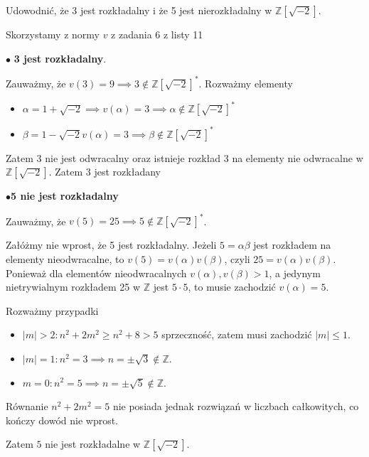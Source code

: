 \begin{problem}[5]
	Udowodnić, że 3 jest rozkładalny i że 5 jest nierozkładalny w $\mathbb{Z}\left[ \sqrt{-2}  \right]$.
\end{problem} 
\begin{solution}

Skorzystamy z normy $v$ z zadania 6 z listy 11

\noindent$\bullet$ \textbf{3 jest rozkładalny}.

Zauważmy, że $v\left( 3 \right) = 9 \implies 3 \not\in \mathbb{Z} \left[ \sqrt{-2}  \right] ^{\ast}$. Rozważmy elementy
\begin{itemize}
	\item $\alpha = 1 + \sqrt{-2} \implies v\left( \alpha  \right) = 3 \implies \alpha \not\in \mathbb{Z} \left[ \sqrt{-2}  \right] ^{\ast} $ 
	\item $\beta = 1 - \sqrt{-2} v\left( \alpha  \right) = 3 \implies \beta  \not\in \mathbb{Z} \left[ \sqrt{-2}  \right] ^{\ast}$
\end{itemize}
Zatem $3$ nie jest odwracalny oraz istnieje rozkład $3$ na elementy nie odwracalne w $\mathbb{Z} \left[ \sqrt{-2}  \right] $. Zatem $3$ jest rozkładany


\noindent$\bullet$\textbf{5 nie jest rozkładalny}

Zauważmy, że $v\left( 5 \right) = 25 \implies 5 \not\in \mathbb{Z} \left[ \sqrt{-2}  \right] ^{\ast} $.

Załóżmy nie wprost, że 5 jest rozkładalny. Jeżeli $5 = \alpha \beta $ jest rozkładem na elementy nieodwracalne, to $v\left( 5 \right) = v\left( \alpha  \right) v\left( \beta  \right)$, czyli $25 = v\left( \alpha  \right) v\left( \beta  \right) $. Ponieważ dla elementów nieodwracalnych $v\left( \alpha  \right) , v\left( \beta  \right) > 1$, a jedynym nietrywialnym rozkładem 25 w $\mathbb{Z}$ jest $5\cdot 5$, to musie zachodzić $v\left( \alpha  \right) = 5$. 

Rozważmy przypadki
\begin{itemize}
	\item $\left| m \right| > 2: n^2 + 2m^2 \ge  n^2 + 8 > 5$ sprzeczność, zatem musi zachodzić $\left| m \right| \le 1$.
	\item $\left| m \right| = 1: n^2 = 3 \implies n = \pm\sqrt{3} \not\in \mathbb{Z}$.
	\item $m=0: n^2 = 5 \implies n = \pm\sqrt{5} \not\in \mathbb{Z} $.
\end{itemize}

Równanie $n^2 + 2m^2 = 5$ nie posiada jednak rozwiązań w liczbach całkowitych, co kończy dowód nie wprost.

Zatem $5$ nie jest rozkładalne w  $\mathbb{Z} \left[ \sqrt{-2}  \right] $.
\end{solution} 
